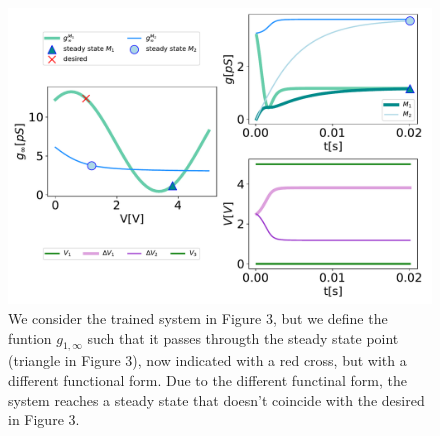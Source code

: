 \documentclass[10.5pt]{article}
\begin{document}
\begin{figure}[h]
    \centering
    \includegraphics[width=0.8\columnwidth]{../plots/grid_trained_change_func.pdf}
    \caption{We consider the trained system in Figure 3, but we define the funtion $g_{1, \infty}$ such that it passes througth the steady state point (triangle in Figure 3), now indicated with a red cross, but with a different functional form. Due to the different functinal form, the system reaches a steady state that doesn't coincide with the desired in Figure 3.}
    \label{fig:memristor_network}
\end{figure} 
\end{document}
